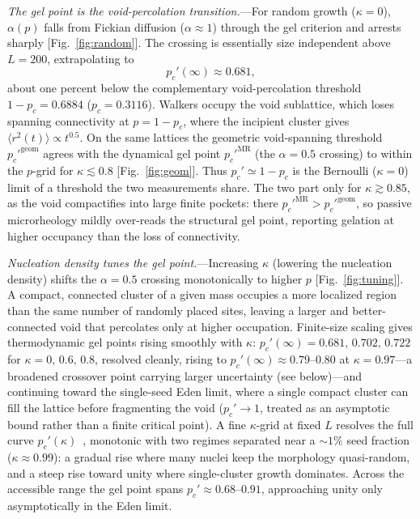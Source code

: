 \documentclass[aps,prl,twocolumn,superscriptaddress,floatfix,nofootinbib,longbibliography]{revtex4-2}
\newcommand{\msd}{\langle r^2(t)\rangle}
\newcommand{\pc}{p_c}
\newcommand{\pcp}{p_c'}
\newcommand{\kap}{\kappa}
\begin{document}
\emph{The gel point is the void-percolation transition.}---For random growth ($\kap=0$), $\alpha(p)$ falls from Fickian diffusion ($\alpha\approx1$) through the gel criterion and arrests sharply [Fig.~\ref{fig:random}]. The crossing is essentially size independent above $L=200$, extrapolating to
\begin{equation}
  \pcp(\infty)\approx0.681 ,
\end{equation}
about one percent below the complementary void-percolation threshold $1-\pc=0.6884$ ($\pc=0.3116$). Walkers occupy the void sublattice, which loses spanning connectivity at $p=1-\pc$, where the incipient cluster gives $\msd\propto t^{0.5}$. On the same lattices the geometric void-spanning threshold $\pcp^{\mathrm{geom}}$ agrees with the dynamical gel point $\pcp^{\mathrm{MR}}$ (the $\alpha=0.5$ crossing) to within the $p$-grid for $\kap\lesssim0.8$ [Fig.~\ref{fig:geom}]. Thus $\pcp\simeq1-\pc$ is the Bernoulli ($\kap=0$) limit of a threshold the two measurements share. The two part only for $\kap\gtrsim0.85$, as the void compactifies into large finite pockets: there $\pcp^{\mathrm{MR}}>\pcp^{\mathrm{geom}}$, so passive microrheology mildly over-reads the structural gel point, reporting gelation at higher occupancy than the loss of connectivity.

\emph{Nucleation density tunes the gel point.}---Increasing $\kap$ (lowering the nucleation density) shifts the $\alpha=0.5$ crossing monotonically to higher $p$ [Fig.~\ref{fig:tuning}]. A compact, connected cluster of a given mass occupies a more localized region than the same number of randomly placed sites, leaving a larger and better-connected void that percolates only at higher occupation. Finite-size scaling gives thermodynamic gel points rising smoothly with $\kap$: $\pcp(\infty)=0.681,\,0.702,\,0.722$ for $\kap=0,\,0.6,\,0.8$, resolved cleanly, rising to $\pcp(\infty)\approx0.79$--$0.80$ at $\kap=0.97$---a broadened crossover point carrying larger uncertainty (see below)---and continuing toward the single-seed Eden limit, where a single compact cluster can fill the lattice before fragmenting the void ($\pcp\to1$, treated as an asymptotic bound rather than a finite critical point). A fine $\kap$-grid at fixed $L$ resolves the full curve $\pcp(\kap)$~\cite{SM}, monotonic with two regimes separated near a $\sim1\%$ seed fraction ($\kap\approx0.99$): a gradual rise where many nuclei keep the morphology quasi-random, and a steep rise toward unity where single-cluster growth dominates. Across the accessible range the gel point spans $\pcp\approx0.68$--$0.91$, approaching unity only asymptotically in the Eden limit.
\end{document}
